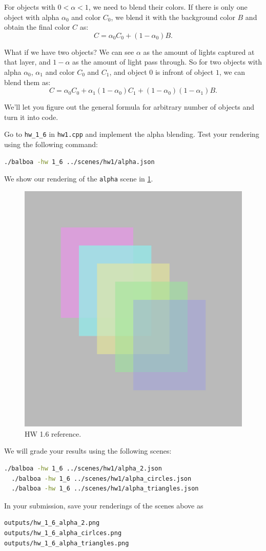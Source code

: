 For objects with $0 < \alpha < 1$, we need to blend their colors. If there is only one object with alpha $\alpha_0$ and color $C_0$, we blend it with the background color $B$ and obtain the final color $C$ as:
\begin{equation}
C = \alpha_0 C_0 + (1 - \alpha_0) B.
\end{equation}

What if we have two objects? We can see $\alpha$ as the amount of lights captured at that layer, and $1-\alpha$ as the amount of light pass through. So for two objects with alpha $\alpha_0$, $\alpha_1$ and color $C_0$ and $C_1$, and object $0$ is infront of object $1$, we can blend them as:
\begin{equation}
C = \alpha_0 C_0 + \alpha_1 (1 - \alpha_0) C_1 + (1 - \alpha_0) (1 - \alpha_1) B.
\end{equation}

We'll let you figure out the general formula for arbitrary number of objects and turn it into code.

Go to \lstinline{hw_1_6} in \lstinline{hw1.cpp} and implement the alpha blending. Test your rendering using the following command:
\begin{lstlisting}[language=bash]
  ./balboa -hw 1_6 ../scenes/hw1/alpha.json
\end{lstlisting}
We show our rendering of the \lstinline{alpha} scene in \cref{fig:hw1_6}.

\begin{figure}[ht]
    \centering
    \includegraphics[width=0.5\linewidth]{imgs/hw_1_6.png}
    \caption{HW 1.6 reference.}
    \label{fig:hw1_6}
\end{figure}

We will grade your results using the following scenes:
\begin{lstlisting}[language=bash]
  ./balboa -hw 1_6 ../scenes/hw1/alpha_2.json
  ./balboa -hw 1_6 ../scenes/hw1/alpha_circles.json
  ./balboa -hw 1_6 ../scenes/hw1/alpha_triangles.json
\end{lstlisting}
In your submission, save your renderings of the scenes above as
\begin{lstlisting}[language=bash]
outputs/hw_1_6_alpha_2.png
outputs/hw_1_6_alpha_cirlces.png
outputs/hw_1_6_alpha_triangles.png
\end{lstlisting}

